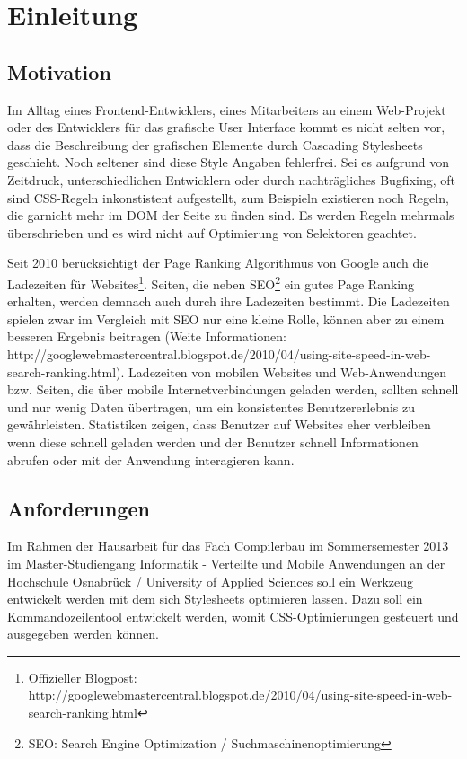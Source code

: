 \section{Einleitung}

\subsection{Motivation}
Im Alltag eines Frontend-Entwicklers, eines Mitarbeiters an einem Web-Projekt oder des Entwicklers für das grafische User Interface kommt es nicht selten vor, dass die Beschreibung der grafischen Elemente durch Cascading Stylesheets geschieht. Noch seltener sind diese Style Angaben fehlerfrei. Sei es aufgrund von Zeitdruck, unterschiedlichen Entwicklern oder durch nachträgliches Bugfixing, oft sind CSS-Regeln inkonstistent aufgestellt, zum Beispieln existieren noch Regeln, die garnicht mehr im DOM der Seite zu finden sind. Es werden Regeln mehrmals überschrieben und es wird nicht auf Optimierung von Selektoren geachtet. 

Seit 2010 berücksichtigt der Page Ranking Algorithmus von Google auch die Ladezeiten für Websites\footnote{Offizieller Blogpost: http://googlewebmastercentral.blogspot.de/2010/04/using-site-speed-in-web-search-ranking.html}. Seiten, die neben SEO\footnote{SEO: Search Engine Optimization / Suchmaschinenoptimierung} ein gutes Page Ranking erhalten, werden demnach auch durch ihre Ladezeiten bestimmt. Die Ladezeiten spielen zwar im Vergleich mit SEO nur eine kleine Rolle, können aber zu einem besseren Ergebnis beitragen (Weite Informationen: http://googlewebmastercentral.blogspot.de/2010/04/using-site-speed-in-web-search-ranking.html).
Ladezeiten von mobilen Websites und Web-Anwendungen bzw. Seiten, die über mobile Internetverbindungen geladen werden, sollten schnell und nur wenig Daten übertragen, um ein konsistentes Benutzererlebnis zu gewährleisten. Statistiken zeigen, dass Benutzer auf Websites eher verbleiben wenn diese schnell geladen werden und der Benutzer schnell Informationen abrufen oder mit der Anwendung interagieren kann.

\subsection{Anforderungen}

Im Rahmen der Hausarbeit für das Fach Compilerbau im Sommersemester 2013 im Master-Studiengang Informatik - Verteilte und Mobile Anwendungen an der Hochschule Osnabrück / University of Applied Sciences soll ein Werkzeug entwickelt werden mit dem sich Stylesheets optimieren lassen. Dazu soll ein Kommandozeilentool entwickelt werden, womit CSS-Optimierungen gesteuert und ausgegeben werden können. 

